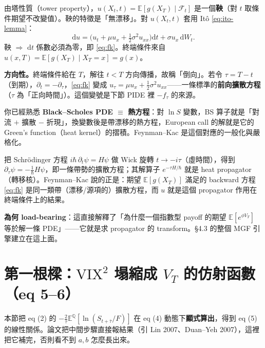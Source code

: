 \documentclass[12pt, a4paper]{article}
\theoremstyle{remark}
\newcommand{\E}{\mathbb{E}}
\newcommand{\Q}{\mathbb{Q}}
\newcommand{\dd}{\mathrm{d}}
\newcommand{\VIX}{\mathrm{VIX}}
\begin{document}
\begin{derivbox}[title={為什麼 $u$ 滿足這條 PDE（鞅論證）}]
由塔性質（tower property），$u(X_t,t)=\E[g(X_T)\mid\mathcal F_t]$ 是一個\textbf{鞅}（對 $t$ 取條件期望不改變值）。鞅的特徵是「無漂移」。對 $u(X_t,t)$ 套用 Itô \eqref{eq:ito-lemma}：
\[
  \dd u = \big(u_t + \mu u_x + \tfrac12\sigma^2 u_{xx}\big)\dd t + \sigma u_x\,\dd W_t.
\]
鞅 $\Rightarrow$ $\dd t$ 係數必須為零，即 \eqref{eq:fk}。終端條件來自 $u(x,T)=\E[g(X_T)\mid X_T=x]=g(x)$。
\end{derivbox}

\textbf{方向性。}終端條件給在 $T$，解往 $t<T$ 方向傳播，故稱「倒向」。若令 $\tau=T-t$（到期），$\partial_t = -\partial_\tau$，\eqref{eq:fk} 變成 $u_\tau = \mu u_x + \frac12\sigma^2 u_{xx}$——一條標準的\textbf{前向擴散方程}（$\tau$ 為「正向時間」）。這個變號是下節 PIDE 裡 $-f_\tau$ 的來源。

\begin{physicsbox}[title={Feynman--Kac $\equiv$ 虛時間 Schrödinger / heat propagator}]
你已經熟悉 \textbf{Black--Scholes PDE $\equiv$ 熱方程}：對 $\ln S$ 變數，BS 算子就是「對流 $+$ 擴散 $-$ 折現」，換變數後是帶漂移的熱方程，European call 的解就是它的 Green's function（heat kernel）的摺積。Feynman--Kac 是這個對應的一般化與嚴格化。

把 Schrödinger 方程 $i\hbar\,\partial_t\psi = H\psi$ 做 Wick 旋轉 $t\to -i\tau$（虛時間），得到 $\partial_\tau\psi = -\frac1\hbar H\psi$，即一條帶勢的擴散方程；其解算子 $e^{-\tau H/\hbar}$ 就是 heat propagator（轉移核）。Feynman--Kac 說的正是：期望 $\E[g(X_T)]$ 滿足的 backward 方程 \eqref{eq:fk} 是同一類帶（漂移/源項的）擴散方程，而 $u$ 就是這個 propagator 作用在終端條件上的結果。

\textbf{為何 load-bearing}：這直接解釋了「為什麼一個指數型 payoff 的期望 $\E[e^{\phi V_T}]$ 等於解一條 PDE」——它就是求 propagator 的 transform。§4.3 的整個 MGF 引擎建立在這上面。
\end{physicsbox}

\newpage

\section{第一根樑：$\VIX^2$ 塌縮成 $V_T$ 的仿射函數（eq 5--6）}

本節把 eq (2) 的 $-\frac{2}{\bar\tau}\E^\Q[\ln(S_{t+\bar\tau}/F)]$ 在 eq (4) 動態下\textbf{顯式算出}，得到 eq (5) 的線性關係。論文把中間步驟直接報結果（引 Lin 2007、Duan--Yeh 2007），這裡把它補完，否則看不到 $a,b$ 怎麼長出來。
\end{document}
